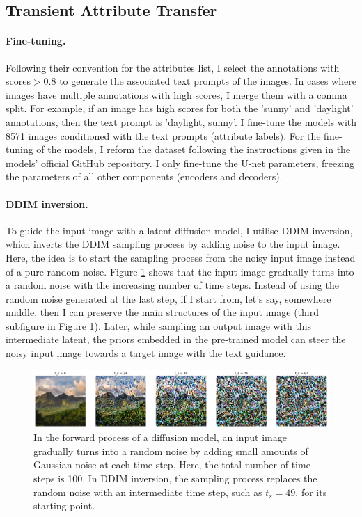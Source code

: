 \subsection{Transient Attribute Transfer}
\paragraph{Fine-tuning.} Following their convention for the attributes list, I select the annotations with scores$ > 0.8$ to generate the associated text prompts of the images. In cases where images have multiple annotations with high scores, I merge them with a comma split. For example, if an image has high scores for both the 'sunny' and 'daylight' annotations, then the text prompt is 'daylight, sunny'. I fine-tune the models with  8571 images conditioned with the text prompts (attribute labels). For the fine-tuning of the models, I reform the dataset following the instructions given in the models' official GitHub repository. I only fine-tune the U-net parameters, freezing the parameters of all other components (encoders and decoders). 

\paragraph{DDIM inversion.} To guide the input image with a latent diffusion model, I utilise \gls{DDIM} inversion, which inverts the DDIM sampling process by adding noise to the input image. Here, the idea is to start the sampling process from the noisy input image instead of a pure random noise. Figure \ref{fig:ddim-inversion} shows that the input image gradually turns into a random noise with the increasing number of time steps. Instead of using the random noise generated at the last step, if I start from, let's say, somewhere middle, then I can preserve the main structures of the input image (third subfigure in Figure \ref{fig:ddim-inversion}). Later, while sampling an output image with this intermediate latent, the priors embedded in the pre-trained model can steer the noisy input image towards a target image with the text guidance.

\begin{figure}[ht]
  \includegraphics[width=\textwidth]{Chapters/zero-shot-tat-figs/DDIM_forward.png}
  \caption{In the forward process of a diffusion model, an input image gradually turns into a random noise by adding small amounts of Gaussian noise at each time step. Here, the total number of time steps is 100. In DDIM inversion, the sampling process replaces the random noise with an intermediate time step, such as $t_s = 49$, for its starting point.}
  \label{fig:ddim-inversion}
\end{figure}

